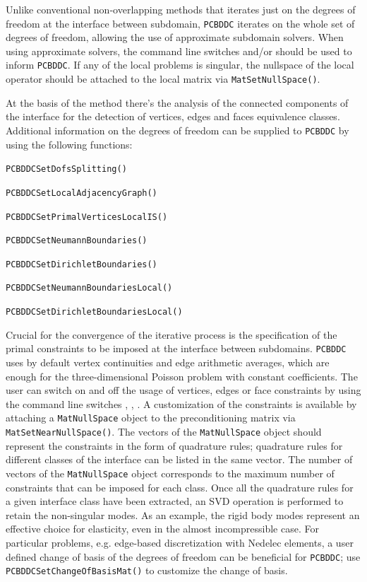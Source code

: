 Unlike conventional non-overlapping methods that iterates just on the degrees of freedom at the interface between subdomain,
\lstinline{PCBDDC} iterates on the whole set of degrees of freedom, allowing the use of approximate subdomain solvers.
When using approximate solvers, the command line switches  and/or  should be used to inform \lstinline{PCBDDC}.
If any of the local problems is singular, the nullspace of the local operator should be attached to the local matrix via \lstinline{MatSetNullSpace()}.

At the basis of the method there's the analysis of the connected components of the interface for the detection of vertices,
edges and faces equivalence classes. Additional information on the degrees of freedom can be supplied to \lstinline{PCBDDC} by using
the following functions:
\begin{tightitemize}
\item \lstinline{PCBDDCSetDofsSplitting()}
\item \lstinline{PCBDDCSetLocalAdjacencyGraph()}
\item \lstinline{PCBDDCSetPrimalVerticesLocalIS()}
\item \lstinline{PCBDDCSetNeumannBoundaries()}
\item \lstinline{PCBDDCSetDirichletBoundaries()}
\item \lstinline{PCBDDCSetNeumannBoundariesLocal()}
\item \lstinline{PCBDDCSetDirichletBoundariesLocal()}
\end{tightitemize}

Crucial for the convergence of the iterative process is the specification of the primal constraints to be imposed at the interface
between subdomains. \lstinline{PCBDDC} uses by default vertex continuities and edge arithmetic averages, which are enough for the three-dimensional
Poisson problem with constant coefficients. The user can switch on and off the usage of vertices, edges or face constraints by using the command line
switches , , . A customization of the constraints is available
by attaching a \lstinline{MatNullSpace} object to
the preconditioning matrix via \lstinline{MatSetNearNullSpace()}. The vectors of the \lstinline{MatNullSpace} object should represent the constraints
in the form of quadrature rules; quadrature rules for different classes of the interface can be listed in the same vector.
The number of vectors of the \lstinline{MatNullSpace} object corresponds to the maximum number of constraints that can be imposed for each class.
Once all the quadrature rules for a given interface class have been extracted, an SVD operation is performed to retain the non-singular modes.
As an example, the rigid body modes represent an effective choice for elasticity, even in the almost incompressible case. For particular problems,
e.g. edge-based discretization with Nedelec elements, a user defined change of basis of the degrees of
freedom can be beneficial for \lstinline{PCBDDC}; use \lstinline{PCBDDCSetChangeOfBasisMat()} to customize the change of basis.

